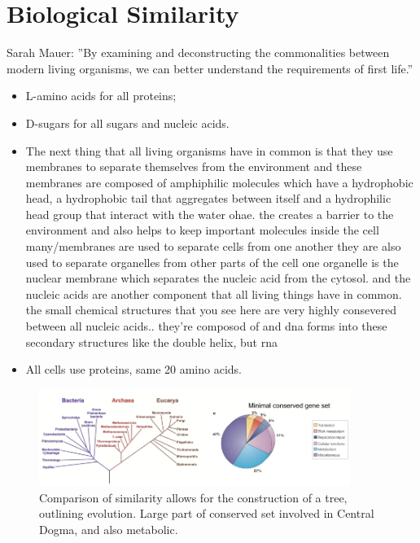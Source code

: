 \documentclass[]{article}
\begin{document}
\section{Biological Similarity}


Sarah Mauer: ''By examining and deconstructing the commonalities between modern living organisms, we can better understand the requirements of first life.''

\begin{itemize}
	\item L-amino acids for all proteins;
	\item D-sugars for all sugars and nucleic acids.
	\item The next thing that all living organisms have in common
	is that they use membranes to separate themselves from the environment
	and these membranes are composed of amphiphilic molecules which have a hydrophobic head, a hydrophobic tail that aggregates between itself and a hydrophilic head group that interact with the water ohae. the creates a barrier to the environment and also helps to keep
	important molecules inside the cell
	many/membranes are used to separate cells from one another they are also used
	to separate organelles from other parts of the cell
	one organelle is the nuclear membrane which separates the nucleic acid from the cytosol. and the nucleic acids are another component that all living things have in common. the small chemical structures that you see here are very highly consevered between all nucleic acids.. they're composod of and dna forms into these secondary structures like the double helix, but rna
	\item All cells use proteins, same 20 amino acids.
\end{itemize}

\begin{figure}[H]
	\caption[Comparison of similarity allows for the
		construction of a tree]{Comparison of similarity allows for the
		construction of a tree, outlining evolution. Large part of conserved set involved in Central Dogma, and also metabolic.}\label{fig:Phylogeny} 
	\includegraphics[width=0.9\textwidth]{Phylogeny}
\end{figure}
\end{document}
